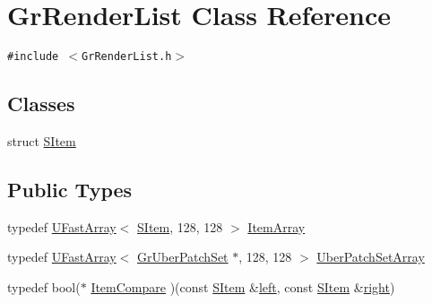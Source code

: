 \hypertarget{class_gr_render_list}{
\section{GrRenderList Class Reference}
\label{class_gr_render_list}
}
{\tt \#include $<$GrRenderList.h$>$}

\subsection*{Classes}
\begin{CompactItemize}
\item 
struct \hyperlink{struct_gr_render_list_1_1_s_item}{SItem}
\end{CompactItemize}
\subsection*{Public Types}
\begin{CompactItemize}
\item 
typedef \hyperlink{class_u_fast_array}{UFastArray}$<$ \hyperlink{struct_gr_render_list_1_1_s_item}{SItem}, 128, 128 $>$ \hyperlink{class_gr_render_list_6726a5c2e28aa9e3834b122747353158}{ItemArray}
\item 
typedef \hyperlink{class_u_fast_array}{UFastArray}$<$ \hyperlink{class_gr_uber_patch_set}{GrUberPatchSet} $\ast$, 128, 128 $>$ \hyperlink{class_gr_render_list_aeb4dd236de429afcff762bc2ab7aecf}{UberPatchSetArray}
\item 
typedef bool($\ast$ \hyperlink{class_gr_render_list_8456ff8c0733596672fc7181c7838996}{ItemCompare} )(const \hyperlink{struct_gr_render_list_1_1_s_item}{SItem} \&\hyperlink{glext_8h_85b8f6c07fbc1fb5d77c2ae090f21995}{left}, const \hyperlink{struct_gr_render_list_1_1_s_item}{SItem} \&\hyperlink{glext_8h_5ffadbbacc6b89cf6218bc43b384d3fe}{right})
\end{CompactItemize}
